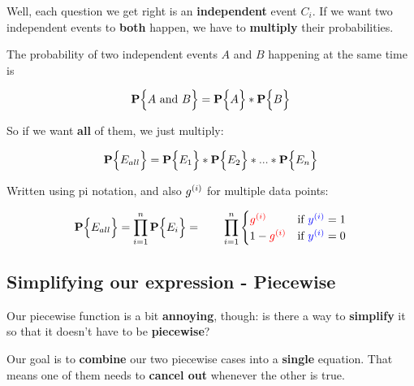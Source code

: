         Well, each question we get right is an \textbf{independent} event $C_i$. If we want two independent events to \textbf{both} happen, we have to \textbf{multiply} their probabilities.\\
        
        \begin{kequation}
            The probability of two independent events $A$ and $B$ happening at the same time is
            
            \begin{equation*}
                \mathbf{P} \Bigl\{A \text{ and } B\Bigr\} = \mathbf{P} \Bigl\{A\Bigr\} * \mathbf{P} \Bigl\{B\Bigr\}
            \end{equation*}
        \end{kequation}

        
        So if we want \textbf{all} of them, we just multiply:
        
        \begin{equation}
            \mathbf{P} \Bigl\{E_{all}\Bigr\} = \mathbf{P} \Bigl\{E_1\Bigr\} * \mathbf{P} \Bigl\{E_2\Bigr\} * ...
            * \mathbf{P} \Bigl\{E_n\Bigr\}
        \end{equation}
        
        Written using pi notation, and also $g^{(i)}$ for multiple data points:
            
        \begin{equation}
            \mathbf{P} \Bigl\{E_{all}\Bigr\} = \prod_{i = 1}^n \mathbf{P} \Bigl\{E_i\Bigr\} = \qquad
            \prod_{i = 1}^n \begin{cases}
                \textcolor{red}{g^{(i)}} & 
                \text{if } \textcolor{blue}{y^{(i)} }=1 \\
                1-\textcolor{red}{g^{(i)}} & 
                \text{if } \textcolor{blue}{y^{(i)} }=0
            \end{cases}
        \end{equation}
        
    \subsection{Simplifying our expression - Piecewise}
        
        Our piecewise function is a bit \textbf{annoying}, though: is there a way to \textbf{simplify} it so that it doesn't have to be \textbf{piecewise}?
        
        Our goal is to \textbf{combine} our two piecewise cases into a \textbf{single} equation. That means one of them needs to \textbf{cancel out} whenever the other is true.
        
